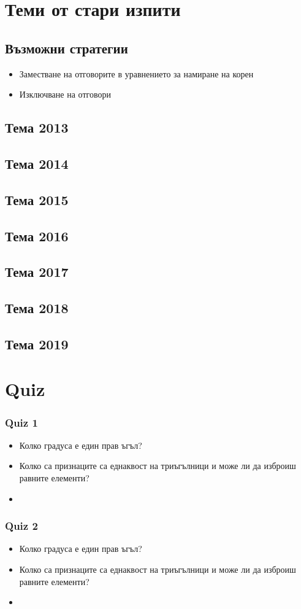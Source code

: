 \documentclass{article}
\begin{document}
\section{Теми от стари изпити}
\subsection{Възможни стратегии}
\begin{itemize}
	\item Заместване на отговорите в уравнението за намиране на корен
	\item Изключване на отговори
\end{itemize}
\subsection{Тема 2013}
\subsection{Тема 2014}
\subsection{Тема 2015}
\subsection{Тема 2016}
\subsection{Тема 2017}
\subsection{Тема 2018}
\subsection{Тема 2019}

\newpage
\section{Quiz}

\subsubsection{Quiz 1}
\begin{itemize}
	\item Колко градуса е един прав ъгъл?
	\item Колко са признаците са еднаквост на триъгълници и може ли да изброиш равните елементи?
	\item 
\end{itemize}


\subsubsection{Quiz 2}
\begin{itemize}
	\item Колко градуса е един прав ъгъл?
	\item Колко са признаците са еднаквост на триъгълници и може ли да изброиш равните елементи?
	\item 
\end{itemize}
\end{document}
